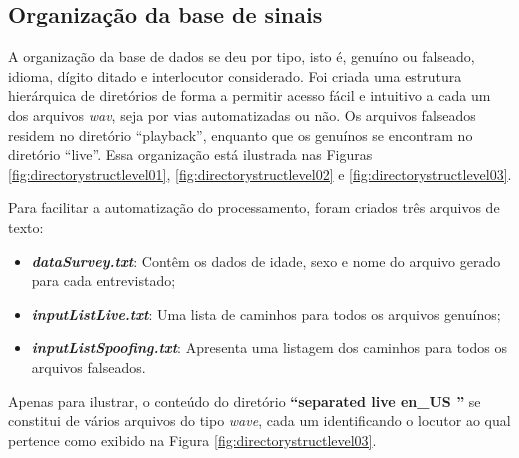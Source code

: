 	    \subsection{Organização da base de sinais}
		\par A organização da base de dados se deu por tipo, isto é, genuíno ou falseado, idioma, dígito ditado e interlocutor considerado. Foi criada uma estrutura hierárquica de diretórios de forma a permitir acesso fácil e intuitivo a cada um dos arquivos \textit{wav}, seja por vias automatizadas ou não. Os arquivos falseados residem no diretório ``playback'', enquanto que os genuínos se encontram no diretório ``live''.	Essa organização está ilustrada nas Figuras \ref{fig:directorystructlevel01}, \ref{fig:directorystructlevel02} e \ref{fig:directorystructlevel03}.\\
		
		\par Para facilitar a automatização do processamento, foram criados três arquivos de texto:
		\begin{itemize}
			\item \textit{\textbf{dataSurvey.txt}}: Contêm os dados de idade, sexo e nome do arquivo gerado para cada entrevistado;
			\item \textit{\textbf{inputListLive.txt}}: Uma lista de caminhos para todos os arquivos genuínos;
			\item \textit{\textbf{inputListSpoofing.txt}}: Apresenta uma listagem dos caminhos para todos os arquivos falseados.
		\end{itemize}
	
		\par Apenas para ilustrar, o conteúdo do diretório \textbf{``separated \textfractionsolidus live \textfractionsolidus en\_US ''} se constitui de vários arquivos do tipo \textit{wave}, cada um identificando o locutor ao qual pertence como exibido na Figura \ref{fig:directorystructlevel03}.


